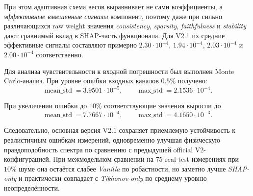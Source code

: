 \documentclass[11pt]{article}
\begin{document}
При этом адаптивная схема весов выравнивает не сами коэффициенты, а \emph{эффективные взвешенные сигналы} компонент, поэтому даже при сильно различающихся raw weight значения
\textit{consistency}, \textit{sparsity}, \textit{faithfulness} и \textit{stability} дают сравнимый вклад в SHAP-часть функционала. Для V2.1 их средние эффективные сигналы составляют примерно $2.30\cdot10^{-4}$, $1.94\cdot10^{-4}$, $2.03\cdot10^{-4}$ и $2.00\cdot10^{-4}$ соответственно.

Для анализа чувствительности к входной погрешности был выполнен Monte Carlo-анализ. При уровне ошибки входных каналов $0.5\%$ получено:
\begin{equation}
\operatorname{mean\_std} = 3.9501 \cdot 10^{-5},
\qquad
\operatorname{max\_std} = 2.1536 \cdot 10^{-4}.
\end{equation}

При увеличении ошибки до $10\%$ соответствующие значения выросли до
\begin{equation}
\operatorname{mean\_std} = 7.7667 \cdot 10^{-4},
\qquad
\operatorname{max\_std} = 4.1650 \cdot 10^{-3}.
\end{equation}

Следовательно, основная версия V2.1 сохраняет приемлемую устойчивость к реалистичным ошибкам измерений, одновременно улучшая физическую правдоподобность спектра по сравнению с предыдущей official V2-конфигурацией. При межмодельном сравнении на 75 real-test измерениях при $10\%$ шуме она остаётся слабее \textit{Vanilla} по робастности, но заметно лучше \textit{SHAP-only} и практически совпадает с \textit{Tikhonov-only} по среднему уровню неопределённости.
\end{document}
